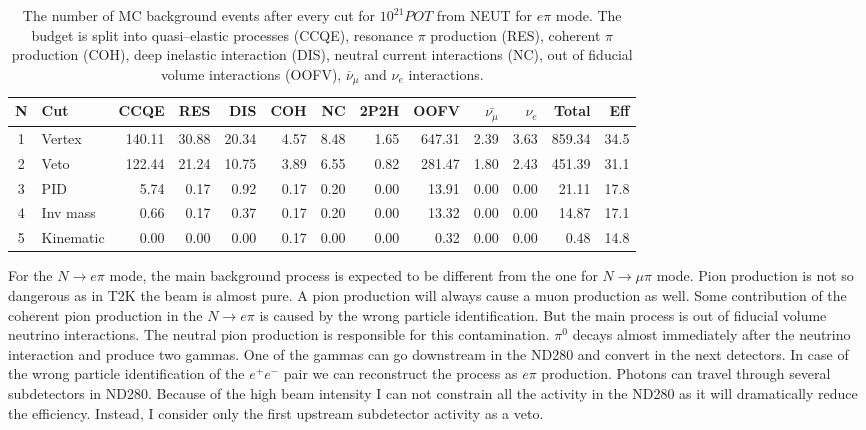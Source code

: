 \documentclass[../main.tex]{subfiles}
\begin{document}
\begin{table}[!ht]
\begin{tabular}{|c|l|r|r|r|r|r|r|r|r|r|r|r|}
  \hline
  N & Cut           &  CCQE   &  RES  &  DIS  &  COH  &  NC  &  2P2H  &  OOFV  &$\bar{\nu_{\mu}}$& $\nu_{e}$ & Total  & Eff\\
  \hline
  1 & Vertex        & 140.11  & 30.88 & 20.34 & 4.57  & 8.48 & 1.65   & 647.31 & 2.39            &  3.63     & 859.34 & 34.5 \\
  \hline
  2 & Veto          & 122.44  & 21.24 & 10.75 & 3.89  & 6.55 & 0.82   & 281.47 & 1.80            &  2.43     & 451.39 & 31.1 \\
  \hline
  3 & PID          & 5.74    & 0.17  & 0.92  & 0.17  & 0.20 & 0.00   & 13.91  & 0.00            &  0.00     &  21.11 & 17.8 \\
  \hline
  4 & Inv mass      & 0.66    & 0.17  & 0.37  & 0.17  & 0.20 & 0.00   & 13.32  & 0.00            &  0.00     &  14.87 & 17.1  \\
  \hline
  5 & Kinematic     & 0.00    & 0.00  & 0.00  & 0.17  & 0.00 & 0.00   & 0.32   & 0.00            &  0.00     &  0.48  & 14.8 \\
    \hline

\end{tabular}
\caption{The number of MC background events after every cut for $10^{21} POT$ from NEUT for $e\pi$ mode. The budget is split into quasi--elastic processes (CCQE), resonance $\pi$ production (RES), coherent $\pi$ production (COH), deep inelastic interaction (DIS), neutral current interactions (NC), out of fiducial volume interactions (OOFV), $\overline{\nu}_\mu$ and $\nu_e$ interactions.}
\label{tbl:HNL:bgOrigEle}
\end{table}

For the $N\to e\pi$ mode, the main background process is expected to be different from the one for $N\to\mu\pi$ mode. Pion production is not so dangerous as in T2K the beam is almost pure. A pion production will always cause a muon production as well. Some contribution of the coherent pion production in the $N\to e\pi$ is caused by the wrong particle identification. But the main process is out of fiducial volume neutrino interactions. The neutral pion production is responsible for this contamination. $\pi^0$ decays almost immediately after the neutrino interaction and produce two gammas. One of the gammas can go downstream in the ND280 and convert in the next detectors. In case of the wrong particle identification of the $e^+e^-$ pair we can reconstruct the process as $e\pi$ production. Photons can travel through several subdetectors in ND280. Because of the high beam intensity I can not constrain all the activity in the ND280 as it will dramatically reduce the efficiency. Instead, I consider only the first upstream subdetector activity as a veto.
\end{document}
